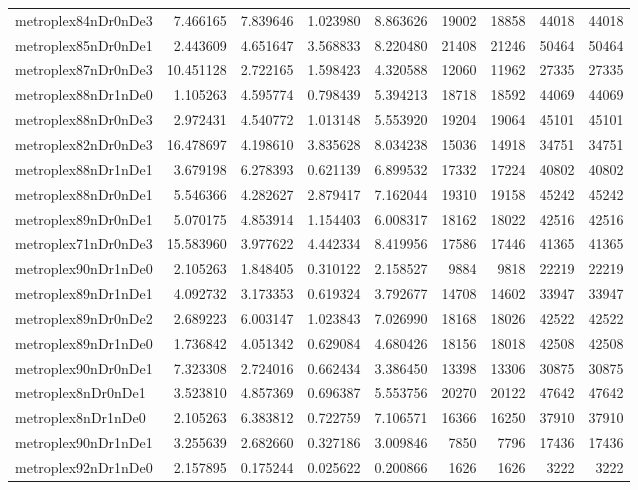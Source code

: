 \begin{longtable}{|l|r|r|r|r|r|r|r|r|}
metroplex84nDr0nDe3 & 7.466165 & 7.839646 & 1.023980 & 8.863626 & 19002 & 18858 & 44018 & 44018 \\
metroplex85nDr0nDe1 & 2.443609 & 4.651647 & 3.568833 & 8.220480 & 21408 & 21246 & 50464 & 50464 \\
metroplex87nDr0nDe3 & 10.451128 & 2.722165 & 1.598423 & 4.320588 & 12060 & 11962 & 27335 & 27335 \\
metroplex88nDr1nDe0 & 1.105263 & 4.595774 & 0.798439 & 5.394213 & 18718 & 18592 & 44069 & 44069 \\
metroplex88nDr0nDe3 & 2.972431 & 4.540772 & 1.013148 & 5.553920 & 19204 & 19064 & 45101 & 45101 \\
metroplex82nDr0nDe3 & 16.478697 & 4.198610 & 3.835628 & 8.034238 & 15036 & 14918 & 34751 & 34751 \\
metroplex88nDr1nDe1 & 3.679198 & 6.278393 & 0.621139 & 6.899532 & 17332 & 17224 & 40802 & 40802 \\
metroplex88nDr0nDe1 & 5.546366 & 4.282627 & 2.879417 & 7.162044 & 19310 & 19158 & 45242 & 45242 \\
metroplex89nDr0nDe1 & 5.070175 & 4.853914 & 1.154403 & 6.008317 & 18162 & 18022 & 42516 & 42516 \\
metroplex71nDr0nDe3 & 15.583960 & 3.977622 & 4.442334 & 8.419956 & 17586 & 17446 & 41365 & 41365 \\
metroplex90nDr1nDe0 & 2.105263 & 1.848405 & 0.310122 & 2.158527 & 9884 & 9818 & 22219 & 22219 \\
metroplex89nDr1nDe1 & 4.092732 & 3.173353 & 0.619324 & 3.792677 & 14708 & 14602 & 33947 & 33947 \\
metroplex89nDr0nDe2 & 2.689223 & 6.003147 & 1.023843 & 7.026990 & 18168 & 18026 & 42522 & 42522 \\
metroplex89nDr1nDe0 & 1.736842 & 4.051342 & 0.629084 & 4.680426 & 18156 & 18018 & 42508 & 42508 \\
metroplex90nDr0nDe1 & 7.323308 & 2.724016 & 0.662434 & 3.386450 & 13398 & 13306 & 30875 & 30875 \\
metroplex8nDr0nDe1 & 3.523810 & 4.857369 & 0.696387 & 5.553756 & 20270 & 20122 & 47642 & 47642 \\
metroplex8nDr1nDe0 & 2.105263 & 6.383812 & 0.722759 & 7.106571 & 16366 & 16250 & 37910 & 37910 \\
metroplex90nDr1nDe1 & 3.255639 & 2.682660 & 0.327186 & 3.009846 & 7850 & 7796 & 17436 & 17436 \\
metroplex92nDr1nDe0 & 2.157895 & 0.175244 & 0.025622 & 0.200866 & 1626 & 1626 & 3222 & 3222 \\

\end{longtable}
